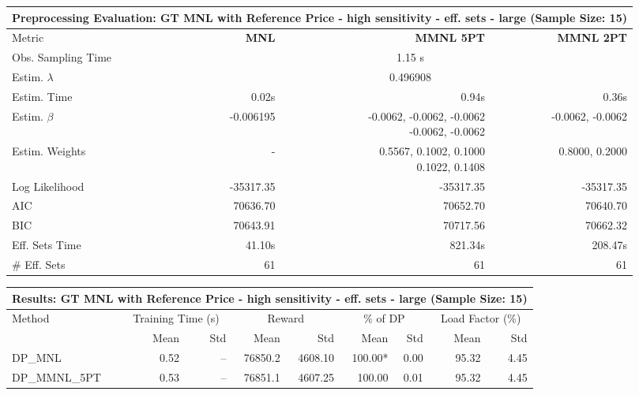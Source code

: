 
\begin{samepage}
\begin{center}
  \small
  \begin{tabular}{l|r|r|r}
    \toprule
    \multicolumn{4}{c}{\textbf{Preprocessing Evaluation: GT MNL with Reference Price - high sensitivity - eff. sets - large (Sample Size: 15)}} \\
    \midrule
    Metric & \textbf{MNL} & \textbf{MMNL 5PT} & \textbf{MMNL 2PT} \\
    \midrule
    Obs. Sampling Time & \multicolumn{3}{c}{1.15 s} \\
    Estim. $\lambda$ & \multicolumn{3}{c}{0.496908} \\
    Estim. Time & 0.02s & 0.94s & 0.36s \\
    Estim. $\beta$ & -0.006195 & \makecell[tr]{-0.0062, -0.0062, -0.0062 \\ -0.0062, -0.0062} & -0.0062, -0.0062 \\
    Estim. Weights & - & \makecell[tr]{0.5567, 0.1002, 0.1000 \\ 0.1022, 0.1408} & 0.8000, 0.2000 \\
    Log Likelihood & -35317.35 & -35317.35 & -35317.35 \\
    AIC & 70636.70 & 70652.70 & 70640.70 \\
    BIC & 70643.91 & 70717.56 & 70662.32 \\
    Eff. Sets Time & 41.10s & 821.34s & 208.47s \\
    \# Eff. Sets & 61 & 61 & 61 \\
    \bottomrule
  \end{tabular}
\end{center}
\begin{center}
  \small
  \begin{tabular}{l|rr|rr|rr|rr}
    \toprule
    \multicolumn{9}{c}{\textbf{Results: GT MNL with Reference Price - high sensitivity - eff. sets - large (Sample Size: 15)}} \\
    \midrule
    Method & \multicolumn{2}{c|}{Training Time (s)} & \multicolumn{2}{c|}{Reward} & \multicolumn{2}{c|}{\% of DP} & \multicolumn{2}{c}{Load Factor (\%)} \\
    & Mean & Std & Mean & Std & Mean & Std & Mean & Std \\
    \midrule
    DP\_MNL      &     0.52 &    -- &    76850.2 &    4608.10 & 100.00* &    0.00 &   95.32 &    4.45 \\
    DP\_MMNL\_5PT &     0.53 &    -- &    76851.1 &    4607.25 &  100.00 &    0.01 &   95.32 &    4.45 \\

\end{tabular}
\end{center}
\end{samepage}
